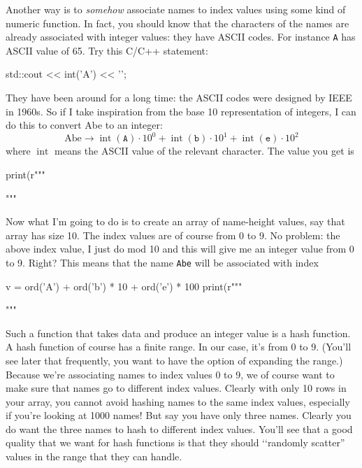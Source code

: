 Another way is to \textit{somehow} associate names to 
index values using some kind of numeric function.
In fact, you should know that the characters of the names
are already associated with integer values: they have ASCII codes.
For instance \verb!A! has ASCII value of 65.
Try this C/C++ statement:
\begin{console}
std::cout << int('A') << '\n';
\end{console}
They have been around for a long time: the ASCII codes were
designed by IEEE in 1960s.
So if I take inspiration from the base 10 representation of 
integers, 
I can do this to convert Abe to an integer:
\[
\text{Abe}
\rightarrow
\operatorname{int}(\texttt{A}) \cdot 10^0 +
\operatorname{int}(\texttt{b}) \cdot 10^1 +
\operatorname{int}(\texttt{e}) \cdot 10^2
\]
where $\operatorname{int}$ means the ASCII value of the relevant character.
The value you get is
\begin{python}
print(r"""\begin{console}
\end{console}""" %
\end{python}
Now what I'm going to do is to create an array of name-height values, say that
array has size 10.
The index values are of course from 0 to 9.
No problem: the above index value, I just do mod 10 and this will give me an integer
value from 0 to 9. Right?
This means that the name \verb!Abe! will be associated with index 
\begin{python}
v = ord('A') + ord('b') * 10 + ord('e') * 100
print(r"""\begin{console}
\end{console}""" %
\end{python}

Such a function that takes data and produce an integer value 
is a hash function.
A hash function of course has a finite range.
In our case, it's from 0 to 9.
(You'll see later that frequently, you want to have the option of 
expanding the range.)
Because we're associating names to index values 0 to 9, we of course
want to make sure that names go to different index values.
Clearly with only 10 rows in your array, you cannot avoid 
hashing names to the same index values, especially if you're looking at 1000 names!
But say you have only three names.
Clearly you do want the three names to hash to different index values.
You'll see that a good quality that we want for hash functions
is that they should \lq\lq randomly scatter'' values in the range that they 
can handle. 

